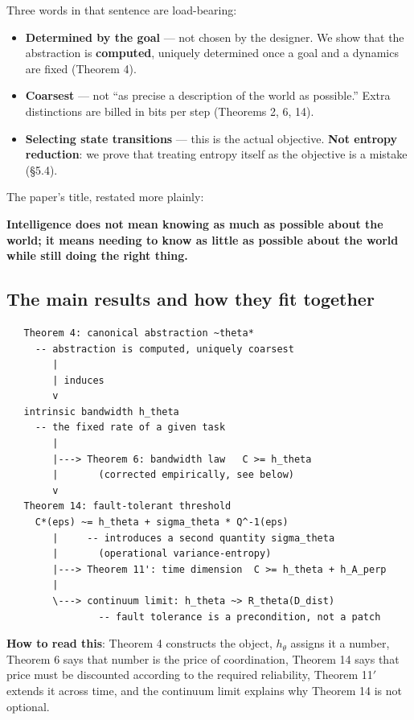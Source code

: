 \documentclass[11pt]{article}
\providecommand{\tightlist}{%
  \setlength{\itemsep}{0pt}\setlength{\parskip}{0pt}}
\renewenvironment{quote}
  {\def\FrameCommand{{\color{gray!60}\vrule width 2pt}\hspace{8pt}}%
   \MakeFramed{\advance\hsize-\width \FrameRestore}\begin{itshape}}
  {\end{itshape}\endMakeFramed}
\begin{document}
Three words in that sentence are load-bearing:

\begin{itemize}
\tightlist
\item
  \textbf{Determined by the goal} --- not chosen by the designer. We show that the abstraction is \textbf{computed}, uniquely determined once a goal and a dynamics are fixed (Theorem 4).
\item
  \textbf{Coarsest} --- not ``as precise a description of the world as possible.'' Extra distinctions are billed in bits per step (Theorems 2, 6, 14).
\item
  \textbf{Selecting state transitions} --- this is the actual objective. \textbf{Not entropy reduction}: we prove that treating entropy itself as the objective is a mistake (\S{}5.4).
\end{itemize}

The paper's title, restated more plainly:

\begin{quote}
\textbf{Intelligence does not mean knowing as much as possible about the world; it means needing to know as little as possible about the world while still doing the right thing.}
\end{quote}

\hypertarget{the-main-results-and-how-they-fit-together}{%
\subsection{The main results and how they fit together}\label{the-main-results-and-how-they-fit-together}}

\begin{verbatim}
   Theorem 4: canonical abstraction ~theta*
     -- abstraction is computed, uniquely coarsest
        |
        | induces
        v
   intrinsic bandwidth h_theta
     -- the fixed rate of a given task
        |
        |---> Theorem 6: bandwidth law   C >= h_theta
        |       (corrected empirically, see below)
        v
   Theorem 14: fault-tolerant threshold
     C*(eps) ~= h_theta + sigma_theta * Q^-1(eps)
        |     -- introduces a second quantity sigma_theta
        |       (operational variance-entropy)
        |---> Theorem 11': time dimension  C >= h_theta + h_A_perp
        |
        \---> continuum limit: h_theta ~> R_theta(D_dist)
                -- fault tolerance is a precondition, not a patch
\end{verbatim}

\textbf{How to read this}: Theorem 4 constructs the object, \(h_\theta\) assigns it a number, Theorem 6 says that number is the price of coordination, Theorem 14 says that price must be discounted according to the required reliability, Theorem 11\('\) extends it across time, and the continuum limit explains why Theorem 14 is not optional.
\end{document}
